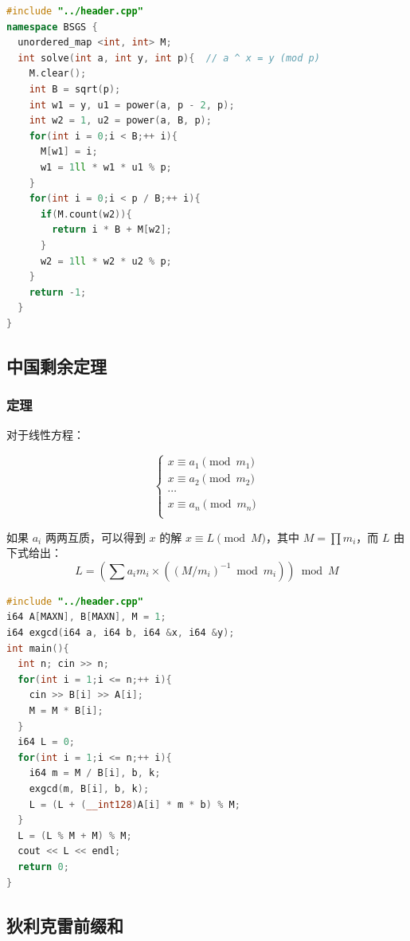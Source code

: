 \documentclass[10pt]{ctexart}
\begin{document}
\begin{multicols}{3}
\begin{lstlisting}[language={C++}]
#include "../header.cpp"
namespace BSGS {
  unordered_map <int, int> M;
  int solve(int a, int y, int p){  // a ^ x = y (mod p)
    M.clear();
    int B = sqrt(p);
    int w1 = y, u1 = power(a, p - 2, p);
    int w2 = 1, u2 = power(a, B, p);
    for(int i = 0;i < B;++ i){
      M[w1] = i;
      w1 = 1ll * w1 * u1 % p;
    }
    for(int i = 0;i < p / B;++ i){
      if(M.count(w2)){
        return i * B + M[w2];
      }
      w2 = 1ll * w2 * u2 % p;
    }
    return -1;
  }
}
\end{lstlisting}

    \subsection{中国剩余定理}\label{ux4e2dux56fdux5269ux4f59ux5b9aux7406}

    \subsubsection{定理}\label{ux5b9aux7406}

    对于线性方程：

    \[
    \begin{cases}
    x \equiv a_1 \pmod {m_1} \\
    x \equiv a_2 \pmod {m_2} \\
    \cdots \\
    x \equiv a_n \pmod {m_n} \\
    \end{cases}
    \]

    如果 \(a_i\) 两两互质，可以得到 \(x\) 的解
    \(x\equiv L\pmod M\)，其中 \(M=\prod m_i\)，而 \(L\)
    由下式给出：\[L = \left(\sum a_i m_i\times (\left(M/m_i\right)^{-1}\bmod m_i)\right)\bmod M\]

\begin{lstlisting}[language={C++}]
#include "../header.cpp"
i64 A[MAXN], B[MAXN], M = 1;
i64 exgcd(i64 a, i64 b, i64 &x, i64 &y);
int main(){
  int n; cin >> n;
  for(int i = 1;i <= n;++ i){
    cin >> B[i] >> A[i];
    M = M * B[i];
  }
  i64 L = 0;
  for(int i = 1;i <= n;++ i){
    i64 m = M / B[i], b, k;
    exgcd(m, B[i], b, k);
    L = (L + (__int128)A[i] * m * b) % M;
  }
  L = (L % M + M) % M;
  cout << L << endl;
  return 0;
}
\end{lstlisting}

    \subsection{狄利克雷前缀和}\label{ux72c4ux5229ux514bux96f7ux524dux7f00ux548c}


\end{multicols}
\end{document}
